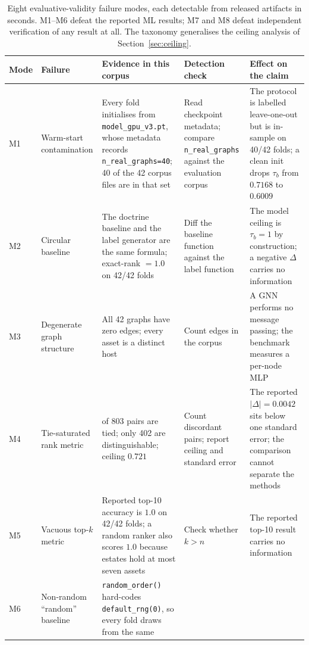 \documentclass[journal,10pt]{IEEEtran}
\newcommand{\tb}{\tau_b}
\begin{document}
\begin{table}[t]
\centering
\caption{Eight evaluative-validity failure modes, each detectable from released artifacts in
seconds. M1--M6 defeat the reported ML results; M7 and M8 defeat independent verification of any
result at all. The taxonomy generalises the ceiling analysis of Section~\ref{sec:ceiling}.}
\label{tab:modes}
\footnotesize
\begin{tabular}{@{}>{\raggedright\arraybackslash}p{0.7cm}>{\raggedright\arraybackslash}p{2.4cm}>{\raggedright\arraybackslash}p{3.4cm}>{\raggedright\arraybackslash}p{3.4cm}>{\raggedright\arraybackslash}p{3.7cm}@{}}
\toprule
\textbf{Mode} & \textbf{Failure} & \textbf{Evidence in this corpus} & \textbf{Detection check} & \textbf{Effect on the claim} \\
\midrule
M1 & Warm-start contamination &
Every fold initialises from \texttt{model\_gpu\_v3.pt}, whose metadata records
\texttt{n\_real\_graphs=40}; 40 of the 42 corpus files are in that set &
Read checkpoint metadata; compare \texttt{n\_real\_graphs} against the evaluation corpus &
The protocol is labelled leave-one-out but is in-sample on 40/42 folds; a clean init drops $\tb$
from $0.7168$ to $0.6009$ \\
\addlinespace
M2 & Circular baseline &
The doctrine baseline and the label generator are the same formula; exact-rank $=1.0$ on 42/42
folds &
Diff the baseline function against the label function &
The model ceiling is $\tb=1$ by construction; a negative $\Delta$ carries no information \\
\addlinespace
M3 & Degenerate graph structure &
All 42 graphs have zero edges; every asset is a distinct host &
Count edges in the corpus &
A GNN performs no message passing; the benchmark measures a per-node MLP \\
\addlinespace
M4 & Tie-saturated rank metric &
401 of 803 pairs are tied; only 402 are distinguishable; ceiling $0.721$ &
Count discordant pairs; report ceiling and standard error &
The reported $|\Delta|=0.0042$ sits below one standard error; the comparison cannot separate the
methods \\
\addlinespace
M5 & Vacuous top-$k$ metric &
Reported top-10 accuracy is $1.0$ on 42/42 folds; a random ranker also scores $1.0$ because estates
hold at most seven assets &
Check whether $k>n$ &
The reported top-10 result carries no information \\
\addlinespace
M6 & Non-random ``random'' baseline &
\texttt{random\_order()} hard-codes \texttt{default\_rng(0)}, so every fold draws from the same

\end{tabular}
\end{table}
\end{document}
